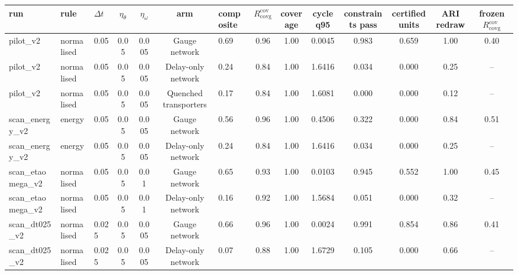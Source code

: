 \begin{tabular}{@{}lllccclccccccc@{}}
\toprule
run & rule & $\Delta t$ & $\eta_\theta$ & $\eta_\omega$ & arm & composite & $R^{\mathrm{cov}}_{\mathrm{covg}}$ & coverage & cycle q95 & constraints pass & certified units & ARI redraw & frozen $R^{\mathrm{cov}}_{\mathrm{covg}}$ \\
\midrule
pilot\_v2 & normalised & 0.05 & 0.05 & 0.005 & Gauge network & 0.69 & 0.96 & 1.00 & 0.0045 & 0.983 & 0.659 & 1.00 & 0.40 \\
pilot\_v2 & normalised & 0.05 & 0.05 & 0.005 & Delay-only network & 0.24 & 0.84 & 1.00 & 1.6416 & 0.034 & 0.000 & 0.25 & -- \\
pilot\_v2 & normalised & 0.05 & 0.05 & 0.005 & Quenched transporters & 0.17 & 0.84 & 1.00 & 1.6081 & 0.000 & 0.000 & 0.12 & -- \\
scan\_energy\_v2 & energy & 0.05 & 0.05 & 0.005 & Gauge network & 0.56 & 0.96 & 1.00 & 0.4506 & 0.322 & 0.000 & 0.84 & 0.51 \\
scan\_energy\_v2 & energy & 0.05 & 0.05 & 0.005 & Delay-only network & 0.24 & 0.84 & 1.00 & 1.6416 & 0.034 & 0.000 & 0.25 & -- \\
scan\_etaomega\_v2 & normalised & 0.05 & 0.05 & 0.01 & Gauge network & 0.65 & 0.93 & 1.00 & 0.0103 & 0.945 & 0.552 & 1.00 & 0.45 \\
scan\_etaomega\_v2 & normalised & 0.05 & 0.05 & 0.01 & Delay-only network & 0.16 & 0.92 & 1.00 & 1.5684 & 0.051 & 0.000 & 0.32 & -- \\
scan\_dt025\_v2 & normalised & 0.025 & 0.05 & 0.005 & Gauge network & 0.66 & 0.96 & 1.00 & 0.0024 & 0.991 & 0.854 & 0.86 & 0.41 \\
scan\_dt025\_v2 & normalised & 0.025 & 0.05 & 0.005 & Delay-only network & 0.07 & 0.88 & 1.00 & 1.6729 & 0.105 & 0.000 & 0.66 & -- \\
\bottomrule
\end{tabular}
